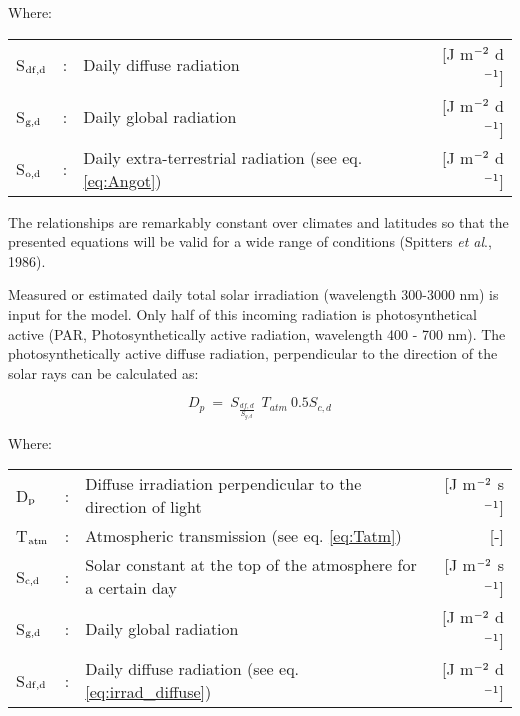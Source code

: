 Where:\\[5pt]
\begin{tabularx}{\textwidth}{llXr}
	S$_{{\rm df,d}}$ &:& Daily diffuse radiation  & [J m$^{{\rm -2}}$ d$^{{\rm -1}}$]\\
	S$_{{\rm g,d}}$ &:& Daily global radiation  & [J m$^{{\rm -2}}$ d$^{{\rm -1}}$]\\
	S$_{{\rm o,d}}$ &:& Daily extra-terrestrial radiation (see eq. \ref{eq:Angot})  & 
	[J m$^{{\rm -2}}$ d$^{{\rm -1}}$]\\
\end{tabularx}

The relationships are remarkably constant over climates and latitudes so that the presented
equations will be valid for a wide range of conditions (Spitters {\it et al}., 1986).

Measured or estimated daily total solar irradiation (wavelength 300-3000 nm) is input for
the model. Only half of this incoming radiation is photosynthetical active (PAR,
Photosynthetically active radiation, wavelength 400 - 700 nm). The photosynthetically active
diffuse radiation, perpendicular to the direction of the solar rays can be calculated as:

\begin{equation}
\label{eq:PAR}
D _{p} ~=~ S _{\frac{df,d}{S _{g,d} }} ~~ T _{atm} ~0.5S _{c,d} 
\end{equation}


Where:\\[5pt]
\begin{tabularx}{\textwidth}{llXr}
	D$_{{\rm p}}$ &:& Diffuse irradiation perpendicular to the direction of light  & 
	[J m$^{{\rm -2}}$ s$^{{\rm -1}}$]\\
	T$_{{\rm atm}}$ &:& Atmospheric transmission (see eq. \ref{eq:Tatm})  & [-]\\
	S$_{{\rm c,d}}$ &:& Solar constant at the top of the atmosphere for a certain day  & 
	[J m$^{{\rm -2}}$ s$^{{\rm -1}}$]\\
	S$_{{\rm g,d}}$ &:& Daily global radiation  & [J m$^{{\rm -2}}$ d$^{{\rm -1}}$]\\
	S$_{{\rm df,d}}$ &:& Daily diffuse radiation (see eq. \ref{eq:irrad_diffuse})  & 
	[J m$^{{\rm -2}}$ d$^{{\rm -1}}$]\\
\end{tabularx}


